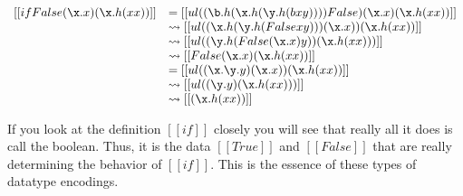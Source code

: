 \documentclass{article}
\newcommand {\redto}[0]{\rightsquigarrow}
\begin{document}
\begin{center}
  \begin{math}
    \begin{array}{lll}
      [[if False (\x.x) (\x.h(x x))]] 
      & = [[ul((\b.h(\x.h(\y.h(b x y)))) False) (\x.x) (\x.h(x x))]]\\
      & \redto [[ul((\x.h(\y.h(False x y))) (\x.x)) (\x.h(x x))]]\\
      & \redto [[ul((\y.h(False (\x.x) y)) (\x.h(x x)))]]\\
      & \redto [[False (\x.x) (\x.h(x x)) ]]\\
      & = [[ul((\x.\y.y) (\x.x)) (\x.h(x x)) ]]\\
      & \redto [[ul((\y.y) (\x.h(x x))) ]]\\
      & \redto [[(\x.h(x x))]]\\
    \end{array}
  \end{math}
\end{center}

If you look at the definition $[[if]]$ closely you will see that
really all it does is call the boolean.  Thus, it is the data
$[[True]]$ and $[[False]]$ that are really determining the behavior of
$[[if]]$.  This is the essence of these types of datatype encodings.
\end{document}
